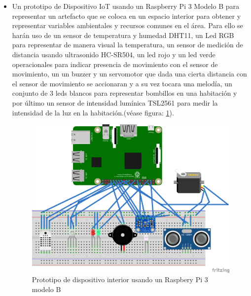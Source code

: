 \begin{itemize}
\item Un prototipo de Dispositivo IoT usando un Raspberry Pi 3 Modelo B para representar un artefacto que se coloca en un espacio interior para obtener y representar variables ambientales y recursos comunes en el área. Para ello se harán uso de un sensor de temperatura y humedad DHT11, un Led RGB para representar de manera visual la temperatura, un sensor de medición de distancia usando ultrasonido HC-SR504, un led rojo y un led verde operacionales para indicar presencia de movimiento con el sensor de movimiento, un un buzzer y un servomotor que dada una cierta distancia con el sensor de movimiento se accionaran y a su vez tocara una melodía, un conjunto de 3 leds blancos para representar bombillos en una habitación y por último un sensor de intensidad lumínica TSL2561 para medir la intensidad de la luz en la habitación.(véase figura: \ref{fig:rpi3javier}).
\begin{figure}[htb]
\centering
\includegraphics[scale=0.5]{./Figuras/rpi3javier.png}
\caption{Prototipo de dispositivo interior usando un Raspbery Pi 3 modelo B}
\label{fig:rpi3javier}
\vspace*{-10pt}
\end{figure}


\end{itemize}
